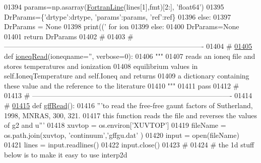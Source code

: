 \begin{DoxyCode}
{{{{{{{{{{{{{01394             params=np.asarray(\hyperlink{classpyneb_1_1utils_1_1_fortran_format_1_1_fortran_line}{FortranLine}(lines[1],fmt)[2:], \textcolor{stringliteral}{'float64'})
01395             DrParams=\{\textcolor{stringliteral}{'drtype'}:drtype, \textcolor{stringliteral}{'params'}:params, \textcolor{stringliteral}{'ref'}:ref\}
01396         \textcolor{keywordflow}{else}:
01397             DrParams = \textcolor{keywordtype}{None}
01398             print((\textcolor{stringliteral}{' for ion %
01399     \textcolor{keywordflow}{else}:
01400         DrParams=\textcolor{keywordtype}{None}
01401     \textcolor{keywordflow}{return} DrParams
01402     \textcolor{comment}{#}
01403     \textcolor{comment}{# -------------------------------------------------------------------------------------}
01404     \textcolor{comment}{#}
\hypertarget{__chianti__tools_8py_source_l01405}{}\hyperlink{namespacepyneb_1_1utils_1_1__chianti__tools_a8b6257cfe133ac906966b20c8721f82a}{01405} \textcolor{keyword}{def }\hyperlink{namespacepyneb_1_1utils_1_1__chianti__tools_a8b6257cfe133ac906966b20c8721f82a}{ioneqRead}(ioneqname='', verbose=0):
01406     \textcolor{stringliteral}{"""}
01407 \textcolor{stringliteral}{    reads an ioneq file and stores temperatures and ionization}
01408 \textcolor{stringliteral}{    equilibrium values in self.IoneqTemperature and self.Ioneq and returns}
01409 \textcolor{stringliteral}{    a dictionary containing these value and the reference to the literature}
01410 \textcolor{stringliteral}{    """}
01411     \textcolor{keywordflow}{pass}
01412     \textcolor{comment}{#}
01413     \textcolor{comment}{# -------------------------------------------------------------------------------------}
01414     \textcolor{comment}{#}
\hypertarget{__chianti__tools_8py_source_l01415}{}\hyperlink{namespacepyneb_1_1utils_1_1__chianti__tools_af524b50fae5a347eff4976b7ce895ab1}{01415} \textcolor{keyword}{def }\hyperlink{namespacepyneb_1_1utils_1_1__chianti__tools_af524b50fae5a347eff4976b7ce895ab1}{gffRead}():
01416     \textcolor{stringliteral}{'''to read the free-free gaunt factors of Sutherland, 1998, MNRAS, 300, 321.}
01417 \textcolor{stringliteral}{    this function reads the file and reverses the values of g2 and u'''}
01418     xuvtop = os.environ[\textcolor{stringliteral}{'XUVTOP'}]
01419     fileName = os.path.join(xuvtop, \textcolor{stringliteral}{'continuum'},\textcolor{stringliteral}{'gffgu.dat'} )
01420     input = open(fileName)
01421     lines = input.readlines()
01422     input.close()
01423     \textcolor{comment}{#}
01424     \textcolor{comment}{#  the 1d stuff below is to make it easy to use interp2d}
}}}}}}}}}}}}}}
\end{DoxyCode}
